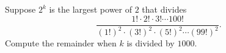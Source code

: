 Suppose $2^k$ is the largest power of $2$ that divides
\[
\dfrac{1!\cdot2!\cdot3!\cdots100!}{(1!)^2\cdot(3!)^2\cdot(5!)^2\cdots(99!)^2}.
\]
Compute the remainder when $k$ is divided by $1000$.

